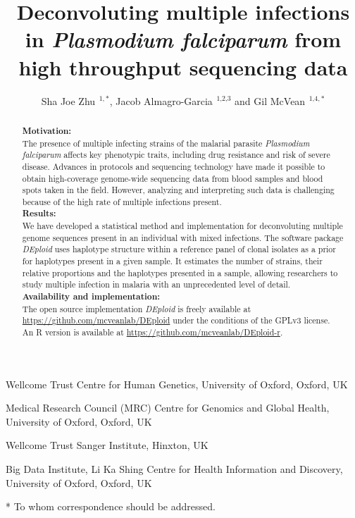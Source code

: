 \documentclass{nature}
\begin{document}
\title{Deconvoluting multiple infections in {\it Plasmodium falciparum} from high throughput sequencing data}
\author{Sha Joe Zhu\,$^{\text{ 1},*}$, Jacob Almagro-Garcia\,$^{\text{ 1,2,3}}$ and Gil McVean\,$^{\text{ 1,4},*}$}

\maketitle

\begin{affiliations}
\item Wellcome Trust Centre for Human Genetics, University of Oxford, Oxford, UK
\item Medical Research Council (MRC) Centre for Genomics and Global Health, University of Oxford, Oxford, UK
\item Wellcome Trust Sanger Institute, Hinxton, UK
\item Big Data Institute, Li Ka Shing Centre for Health Information and Discovery, University of Oxford, Oxford, UK
\item[*] To whom correspondence should be addressed.
\end{affiliations}

\begin{abstract}
\noindent\textbf{Motivation:}  \\ \noindent
The presence of multiple infecting strains of the malarial parasite {\it Plasmodium falciparum} affects  key phenotypic  traits, including drug resistance and risk of severe disease. Advances in protocols and sequencing technology have made it possible  to obtain  high-coverage genome-wide  sequencing data from blood samples and blood spots taken in the field. However, analyzing and interpreting such data is challenging  because of the high rate of multiple infections present.\\
\textbf{Results:}  \\ \noindent  We have developed a statistical method and implementation for deconvoluting multiple genome sequences present in an individual with mixed infections.  The software package {\it DEploid} uses haplotype structure within a reference panel of clonal isolates as a prior for haplotypes present in a given sample. It estimates the number of strains, their relative proportions and the haplotypes presented in a sample, allowing researchers to study multiple infection in malaria with an unprecedented level of detail.\\
\textbf{Availability and implementation:}  \\ \noindent  The open source implementation {\it DEploid} is freely available at \href{https://github.com/mcveanlab/DEploid}{https://github.com/mcveanlab/DEploid} under the conditions of the GPLv3 license. \\
An R version is available at \href{https://github.com/mcveanlab/DEploid-r}{https://github.com/mcveanlab/DEploid-r}.\\
\end{abstract}
\end{document}
